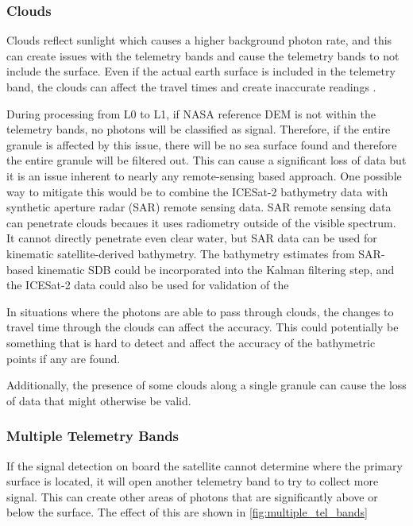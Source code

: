 \subsubsection{Clouds}

Clouds reflect sunlight which causes a higher background photon rate, and this can create issues with the telemetry bands and cause the telemetry bands to not include the surface. Even if the actual earth surface is included in the telemetry band, the clouds can affect the travel times and create inaccurate readings \parencite{atl03knownissues}.

During processing from L0 to L1, if NASA reference DEM is not within the telemetry bands, no photons will be classified as signal. Therefore, if the entire granule is affected by this issue, there will be no sea surface found and therefore the entire granule will be filtered out. This can cause a significant loss of data but it is an issue inherent to nearly any remote-sensing based approach. One possible way to mitigate this would be to combine the ICESat-2 bathymetry data with synthetic aperture radar (SAR) remote sensing data. SAR remote sensing data can penetrate clouds becaues it uses radiometry outside of the visible spectrum. It cannot directly penetrate even clear water, but SAR data can be used for kinematic satellite-derived bathymetry. The bathymetry estimates from SAR-based kinematic SDB could be incorporated into the Kalman filtering step, and the ICESat-2 data could also be used for validation of the 

In situations where the photons are able to pass through clouds, the changes to travel time through the clouds can affect the accuracy. This could potentially be something that is hard to detect and affect the accuracy of the bathymetric points if any are found.

Additionally, the presence of some clouds along a single granule can cause the loss of data that might otherwise be valid.  

\subsubsection{Multiple Telemetry Bands}

If the signal detection on board the satellite cannot determine where the primary surface is located, it will open another telemetry band to try to collect more signal. This can create other areas of photons that are significantly above or below the surface. The effect of this are shown in \ref{fig:multiple_tel_bands}

